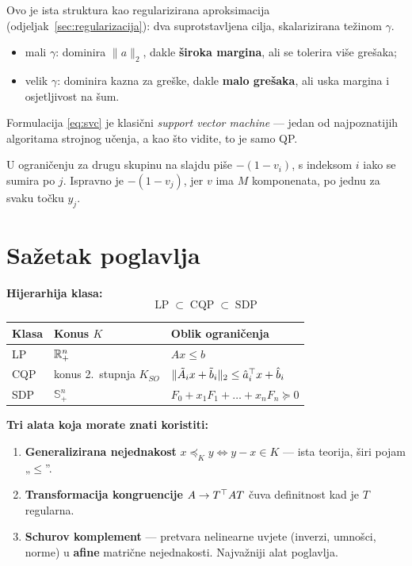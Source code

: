 \begin{napomena}
Ovo je ista struktura kao regularizirana aproksimacija
(odjeljak~\ref{sec:regularizacija}): dva suprotstavljena cilja, skalarizirana
težinom $\gamma$.
\begin{itemize}
  \item mali $\gamma$: dominira $\|a\|_2$, dakle \textbf{široka margina}, ali se
        tolerira više grešaka;
  \item velik $\gamma$: dominira kazna za greške, dakle \textbf{malo grešaka},
        ali uska margina i osjetljivost na šum.
\end{itemize}
Formulacija \eqref{eq:svc} je klasični \emph{support vector machine} --- jedan od
najpoznatijih algoritama strojnog učenja, a kao što vidite, to je samo QP.
\end{napomena}

\begin{napomena}
U ograničenju za drugu skupinu na slajdu piše $-(1 - v_i)$, s indeksom $i$
iako se sumira po $j$. Ispravno je $-(1 - v_j)$, jer $v$ ima $M$ komponenata,
po jednu za svaku točku $y_j$.
\end{napomena}

\section{Sažetak poglavlja}

\textbf{Hijerarhija klasa:}
\[
\text{LP} \;\subset\; \text{CQP} \;\subset\; \text{SDP}
\]

\begin{center}
\begin{tabular}{P{2.0cm}P{4.4cm}P{6.4cm}}
\toprule
\textbf{Klasa} & \textbf{Konus $K$} & \textbf{Oblik ograničenja} \\
\midrule
LP & $\mathbb{R}^n_+$ & $Ax \le b$ \\
CQP & konus 2.\ stupnja $K_{SO}$
   & $\|\tilde A_ix + \tilde b_i\|_2 \le \hat a_i^{\top} x + \hat b_i$ \\
SDP & $\mathbb{S}^n_+$ & $F_0 + x_1F_1 + \dots + x_nF_n \succeq 0$ \\
\bottomrule
\end{tabular}
\end{center}

\textbf{Tri alata koja morate znati koristiti:}

\begin{enumerate}
  \item \textbf{Generalizirana nejednakost} $x \preceq_K y \Leftrightarrow
        y - x \in K$ --- ista teorija, širi pojam „$\le$”.
  \item \textbf{Transformacija kongruencije} $A \to T^{\top} AT$ čuva definitnost
        kad je $T$ regularna.
  \item \textbf{Schurov komplement} --- pretvara nelinearne uvjete (inverzi,
        umnošci, norme) u \textbf{afine} matrične nejednakosti. Najvažniji alat
        poglavlja.
\end{enumerate}

